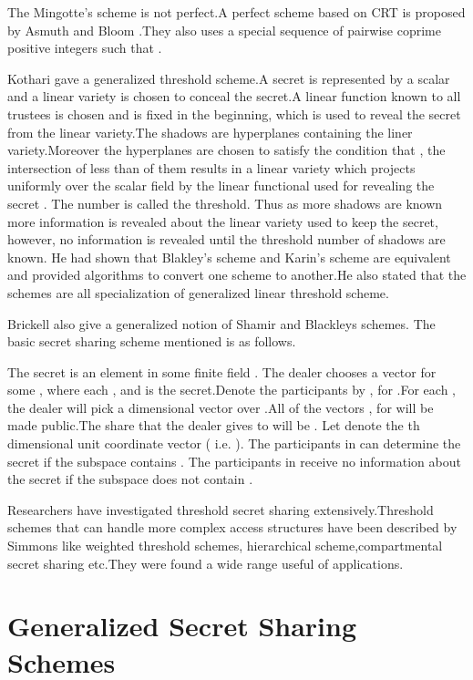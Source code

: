 \documentclass{llncs}
\begin{document}
The Mingotte's scheme is not perfect.A perfect scheme based on CRT is 
 proposed by Asmuth and Bloom \cite{asmuth1983}.They also uses a special sequence of pairwise coprime positive integers  such that .
 

Kothari \cite{kothari1985generalized} gave a generalized threshold scheme.A secret is represented by a scalar and a linear variety is chosen to conceal the secret.A linear function known to all trustees is chosen and is fixed in the beginning, which is used to reveal the secret from the linear variety.The  shadows are hyperplanes containing the liner variety.Moreover the hyperplanes are chosen to satisfy the condition that , the intersection of less than  of them results in a linear variety which projects uniformly over the scalar field by the linear functional used for revealing the secret . The number  is called the threshold. Thus as more shadows are known more information is revealed about the linear variety used to keep the secret, however, no information is revealed until the threshold number of shadows are known.
He had shown that Blakley's scheme and Karin's scheme are equivalent and provided algorithms to convert one scheme to another.He also stated that the schemes are all specialization of generalized linear threshold scheme.

Brickell\cite{brickell1989some} also give a generalized notion of Shamir and Blackleys schemes. The basic secret sharing scheme mentioned is as follows.
 
The secret is an element in some finite field . The dealer chooses a vector  for some , where each , and  is the secret.Denote the participants by , for .For each , the dealer will pick a dimensional vector  over .All of the vectors , for  will be made public.The share that the dealer gives to  will be . Let  denote the  th  dimensional unit coordinate vector ( i.e. ). 
The participants in  can determine the secret if the subspace   contains .
The participants in  receive no information about the secret if the subspace  does not contain .

Researchers have investigated  threshold secret sharing extensively.Threshold schemes that can handle more complex access structures have been described by Simmons \cite{simmons1992} like weighted threshold schemes, hierarchical scheme,compartmental secret sharing etc.They were found a wide range useful of applications.

\section{Generalized Secret Sharing Schemes}
\end{document}
